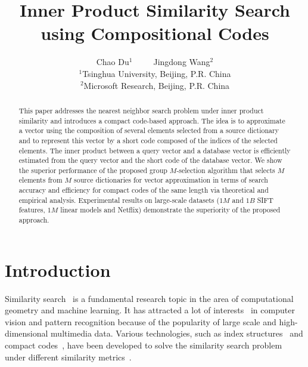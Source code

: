 \documentclass[10pt, letterpaper]{article}
\begin{document}

\title{Inner Product Similarity Search using Compositional Codes} %



\author{Chao Du$^{1}$~~~~~Jingdong Wang$^{2}$ \\
$^{1}$Tsinghua University, Beijing, P.R. China\\$^{2}$Microsoft Research, Beijing, P.R. China}


\maketitle

\begin{abstract}
This paper addresses the nearest neighbor search
problem
under inner product similarity
and introduces a compact code-based approach.
The idea is
to approximate a vector
using the composition of several elements selected from a source dictionary
and to represent this vector
by a short code composed of
the indices of the selected elements.
The inner product between a query vector
and a database vector
is efficiently estimated
from the query vector and the short code of the database vector.
We show the superior performance of the proposed group $M$-selection algorithm
that selects $M$ elements from $M$ source dictionaries for vector approximation
in terms of search accuracy and efficiency
for compact codes of the same length
via theoretical and empirical analysis.
Experimental results
on large-scale datasets ($1M$ and $1B$ SIFT features,
$1M$ linear models and Netflix)
demonstrate the superiority of the proposed approach.
\end{abstract}


\section{Introduction}
Similarity search~\cite{SameFoun2006} is a fundamental research topic
in the area of
computational geometry and machine learning.
It has attracted a lot of interests~\cite{ShakhnarovichDI06}
in computer vision and pattern recognition
because of
the popularity of large scale and high-dimensional multimedia data.
Various technologies,
such as index structures~\cite{Bentley75,MujaL09} and compact codes~\cite{DatarIIM04,JegouDS11},
have been developed
to solve the similarity search problem
under different similarity metrics~\cite{Andoni09}.
\end{document}
